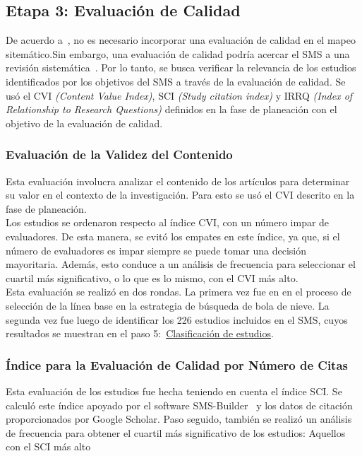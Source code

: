 \subsection{Etapa 3: Evaluación de Calidad}
De acuerdo a~\cite{8747000}, no es necesario incorporar una evaluación de calidad en el mapeo sitemático.Sin embargo, una evaluación de calidad podría acercar el SMS a una revisión sistemática~\cite{10.1145/2601248.2601268}. Por lo tanto, se busca verificar la relevancia de los estudios identificados por los objetivos del SMS a través de la evaluación de calidad. Se usó el CVI \textit{(Content Value Index)}, SCI \textit{(Study citation index)} y IRRQ \textit{(Index of Relationship to Research Questions)} definidos en la fase de planeación con el objetivo de la evaluación de calidad.
\mbox{}\\

\subsubsection{Evaluación de la Validez del Contenido}
Esta evaluación involucra analizar el contenido de los artículos para determinar su valor en el contexto de la investigación. Para esto se usó el CVI descrito en la fase de planeación. \\
Los estudios se ordenaron respecto al índice CVI, con un número impar de evaluadores. De esta manera, se evitó los empates en este índice, ya que, si el número de evaluadores es impar siempre se puede tomar una decisión mayoritaria. Además, esto conduce a un análisis de frecuencia para seleccionar el cuartil más significativo, o lo que es lo mismo, con el CVI más alto. \\
Esta evaluación se realizó en dos rondas. La primera vez fue en en el proceso de selección de la línea base en la estrategia de búsqueda de bola de nieve. La segunda vez fue luego de identificar los 226 estudios incluidos en el SMS, cuyos resultados se muestran en el paso 5:~\hyperref[sec:clasificacion-estudios]{Clasificación de estudios}.
\mbox{}\\

\subsubsection{Índice para la Evaluación de Calidad por Número de Citas}
Esta evaluación de los estudios fue hecha teniendo en cuenta el índice SCI. Se calculó este índice apoyado por el software SMS-Builder~\cite{candela2020smsbuilder} y los datos de citación proporcionados por Google Scholar. Paso seguido, también se realizó un análisis de frecuencia para obtener el cuartil más significativo de los estudios: Aquellos con el SCI más alto \\
\mbox{}\\

